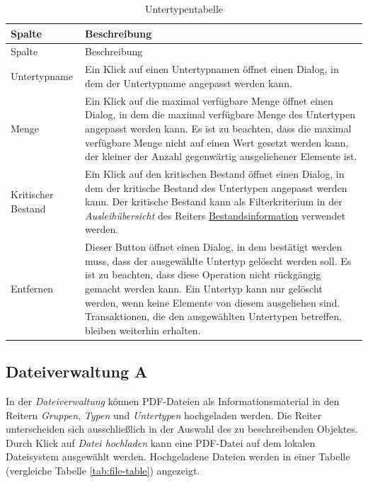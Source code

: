\documentclass[
]{article}
\begin{document}
\begin{longtable}[]{@{}
  >{\raggedright\arraybackslash}p{}
  >{\raggedright\arraybackslash}p{}@{}}
\caption{\label{tab:subtype-table} Untertypentabelle}\tabularnewline
\toprule
Spalte & Beschreibung \\
\midrule
\endfirsthead
\toprule
Spalte & Beschreibung \\
\midrule
\endhead
Untertypname & Ein Klick auf einen Untertypnamen öffnet einen Dialog, in dem der Untertypname angepasst werden kann. \\
Menge & Ein Klick auf die maximal verfügbare Menge öffnet einen Dialog, in dem die maximal verfügbare Menge des Untertypen angepasst werden kann. Es ist zu beachten, dass die maximal verfügbare Menge nicht auf einen Wert gesetzt werden kann, der kleiner der Anzahl gegenwärtig ausgeliehener Elemente ist. \\
Kritischer Bestand & Ein Klick auf den kritischen Bestand öffnet einen Dialog, in dem der kritische Bestand des Untertypen angepasst werden kann. Der kritische Bestand kann als Filterkriterium in der \emph{Ausleihübersicht} des Reiters \protect\hyperlink{reporting}{Bestandsinformation} verwendet werden. \\
Entfernen & Dieser Button öffnet einen Dialog, in dem bestätigt werden muss, dass der ausgewählte Untertyp gelöscht werden soll. Es ist zu beachten, dass diese Operation nicht rückgängig gemacht werden kann. Ein Untertyp kann nur gelöscht werden, wenn keine Elemente von diesem ausgeliehen sind. Transaktionen, die den ausgewählten Untertypen betreffen, bleiben weiterhin erhalten. \\
\bottomrule
\end{longtable}

\hypertarget{file-management}{%
\subsection{Dateiverwaltung A}\label{file-management}}

In der \emph{Dateiverwaltung} können PDF-Dateien als Informationsmaterial in den Reitern \emph{Gruppen}, \emph{Typen} und \emph{Untertypen} hochgeladen werden. Die Reiter unterscheiden sich ausschließlich in der Auswahl des zu beschreibenden Objektes. Durch Klick auf \emph{Datei hochladen} kann eine PDF-Datei auf dem lokalen Dateisystem ausgewählt werden. Hochgeladene Dateien werden in einer Tabelle (vergleiche Tabelle \ref{tab:file-table}) angezeigt.
\end{document}
